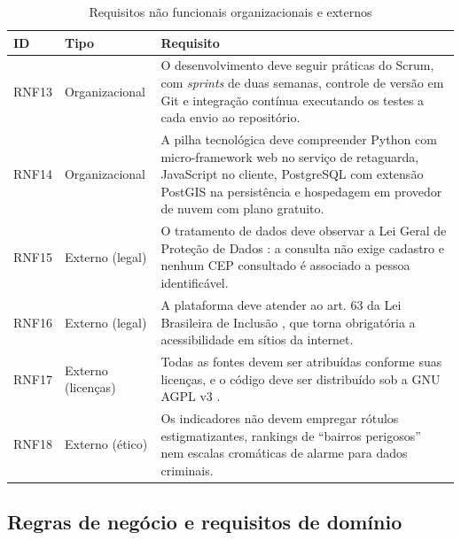 \begin{table}[htb]
	\caption{Requisitos não funcionais organizacionais e externos}
	\label{qua:rnf-org}
	\centering
	\small
	\begin{tabularx}{\textwidth}{C{1.3cm}C{2.4cm}X}
		\toprule
		\textbf{ID} & \textbf{Tipo}      & \textbf{Requisito}                                                                                                                                                                                                         \\
		\midrule
		RNF13       & Organizacional     & O desenvolvimento deve seguir práticas do Scrum, com \emph{sprints} de duas semanas, controle de versão em Git e integração contínua executando os testes a cada envio ao repositório.                                     \\
		RNF14       & Organizacional     & A pilha tecnológica deve compreender Python com micro-framework web no serviço de retaguarda, JavaScript no cliente, PostgreSQL com extensão PostGIS na persistência e hospedagem em provedor de nuvem com plano gratuito. \\
		RNF15       & Externo (legal)    & O tratamento de dados deve observar a Lei Geral de Proteção de Dados \cite{lgpd2018}: a consulta não exige cadastro e nenhum CEP consultado é associado a pessoa identificável.                                            \\
		RNF16       & Externo (legal)    & A plataforma deve atender ao art. 63 da Lei Brasileira de Inclusão \cite{lbi2015}, que torna obrigatória a acessibilidade em sítios da internet.                                                                           \\
		RNF17       & Externo (licenças) & Todas as fontes devem ser atribuídas conforme suas licenças, e o código deve ser distribuído sob a GNU AGPL v3 \cite{agplv3}.                                                                                              \\
		RNF18       & Externo (ético)    & Os indicadores não devem empregar rótulos estigmatizantes, rankings de ``bairros perigosos'' nem escalas cromáticas de alarme para dados criminais.                                                                        \\
		\bottomrule
	\end{tabularx}
\end{table}

\subsection{Regras de negócio e requisitos de domínio}

